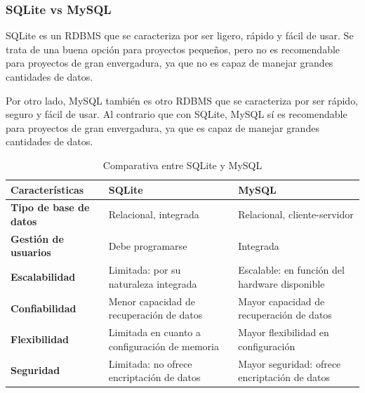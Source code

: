            \subsubsection{SQLite vs MySQL}

                SQLite es un RDBMS \cite{sqlite} que se caracteriza por ser ligero, rápido y fácil de usar. Se trata de una buena opción para proyectos pequeños, pero no es recomendable para proyectos de gran envergadura, ya que no es capaz de manejar grandes cantidades de datos.
                
                Por otro lado, MySQL también es otro RDBMS \cite{mysql} que se caracteriza por ser rápido, seguro y fácil de usar. Al contrario que con SQLite, MySQL sí es recomendable para proyectos de gran envergadura, ya que es capaz de manejar grandes cantidades de datos.

                \begin{table}[h]
                    \centering
                    
                    \begin{tabular}{|>{\centering\arraybackslash}m{4cm}|>{\centering\arraybackslash}m{5cm}|>{\centering\arraybackslash}m{5cm}|}
                        \hline
                        \textbf{Características} & \textbf{SQLite} & \textbf{MySQL} \\
                        \hline
                        \hline
                        \textbf{Tipo de base de datos} & Relacional, integrada & Relacional, cliente-servidor \\
                        \hline
                        \textbf{Gestión de usuarios} & Debe programarse & Integrada \\
                        \hline
                        \textbf{Escalabilidad} & Limitada: por su naturaleza integrada & Escalable: en función del hardware disponible \\
                        \hline
                        \textbf{Confiabilidad} & Menor capacidad de recuperación de datos & Mayor capacidad de recuperación de datos \\
                        \hline
                        \textbf{Flexibilidad} & Limitada en cuanto a configuración de memoria & Mayor flexibilidad en configuración \\
                        \hline
                        \textbf{Seguridad} & Limitada: no ofrece encriptación de datos & Mayor seguridad: ofrece encriptación de datos \\
                        \hline
                    \end{tabular}
                        
                    \caption{Comparativa entre SQLite y MySQL}
                    \label{tabla:mysql-vs-sqlite}
                \end{table}

